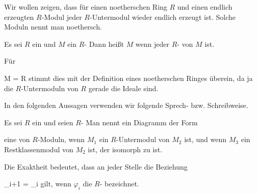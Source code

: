 \setcounter{section}{10}







Wir wollen zeigen, dass für einen noetherschen Ring $R$ und einen endlich erzeugten $R$-Modul jeder $R$-Untermodul wieder endlich erzeugt ist. Solche Moduln nennt man noethersch.


{}
{





Es sei $R$ ein
und $M$ ein
$R$-
Dann heißt $M$  wenn jeder
$R$-
von $M$
ist.





}

Für

\mavergleichskette
{\vergleichskette
{ M
}
{ = }{ R
}
{  }{
}
{    }{
}
{   }{
}
}
{}{}{}
stimmt dies mit der Definition eines noetherschen Ringes überein, da ja die $R$-Untermoduln von $R$ gerade die Ideale sind.

In den folgenden Aussagen verwenden wir folgende Sprech- bzw. Schreibweise.


{}
{





Es sei $R$ ein
und seien
$R$-
Man nennt ein Diagramm der Form

 {  }

eine  von $R$-Moduln, wenn $M_1$ ein $R$-Untermodul von $M_2$ ist, und wenn $M_3$ ein Restklassenmodul von $M_2$ ist, der isomorph zu
 ist.





}

Die Exaktheit bedeutet, dass an jeder Stelle die Beziehung

\mavergleichskettedisp
{\vergleichskette
{   \varphi_{i+1}
}
{ =} {   \varphi_i
}
{ } {
}
{ } {
}
{ } {
}
}
{}{}{}
gilt, wenn $\varphi_i$ die
$R$-
bezeichnet.





